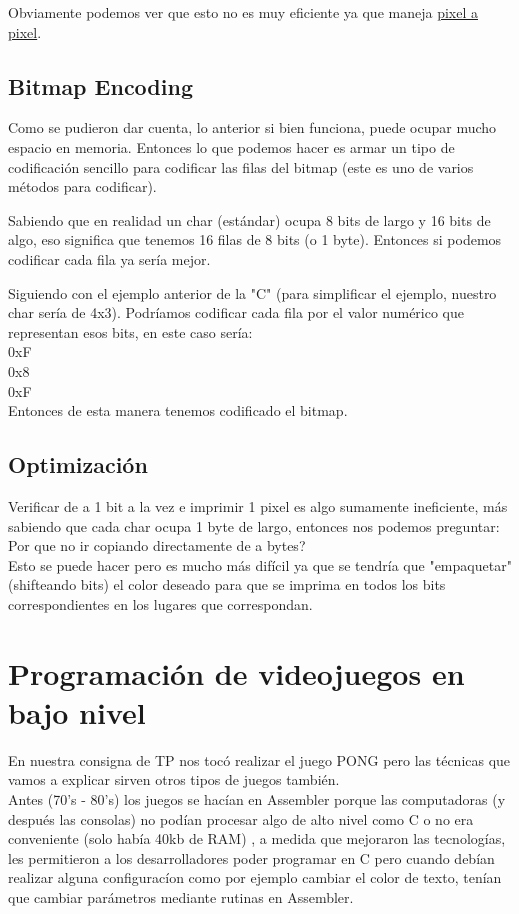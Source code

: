 \documentclass[]{article}
\begin{document}
Obviamente podemos ver que esto no es muy eficiente ya que maneja \underline{pixel a pixel}.\\

\subsection*{Bitmap Encoding}
Como se pudieron dar cuenta, lo anterior si bien funciona, puede ocupar mucho espacio en memoria. Entonces lo que podemos hacer es armar un tipo de codificaci\'on sencillo para codificar las filas del bitmap (este es uno de varios m\'etodos para codificar).

Sabiendo que en realidad un char (est\'andar) ocupa 8 bits de largo y 16 bits de algo, eso significa que tenemos 16 filas de 8 bits (o 1 byte). Entonces si podemos codificar cada fila ya ser\'ia mejor.

Siguiendo con el ejemplo anterior de la "C" (para simplificar el ejemplo, nuestro char ser\'ia de 4x3). Podr\'iamos codificar cada fila por el valor num\'erico que representan esos bits, en este caso ser\'ia:\\
0xF\\
0x8\\
0xF\\
Entonces de esta manera tenemos codificado el bitmap.

\subsection*{Optimizaci\'on}
Verificar de a 1 bit a la vez e imprimir 1 pixel es algo sumamente ineficiente, m\'as sabiendo que cada char ocupa 1 byte de largo, entonces nos podemos preguntar: Por que no ir copiando directamente de a bytes?\\

Esto se puede hacer pero es mucho m\'as dif\'icil ya que se tendr\'ia que "empaquetar" (shifteando bits) el color deseado para que se imprima en todos los bits correspondientes en los lugares que correspondan.


\section*{Programaci\'on de videojuegos en bajo nivel}
En nuestra consigna de TP nos toc\'o realizar el juego PONG pero las t\'ecnicas que vamos a explicar sirven otros tipos de juegos tambi\'en.\\

Antes (70's - 80's) los juegos se hac\'ian en Assembler porque las computadoras (y despu\'es las consolas) no pod\'ian procesar algo de alto nivel como C o no era conveniente (solo hab\'ia 40kb de RAM) , a medida que mejoraron las tecnolog\'ias, les permitieron a los desarrolladores poder programar en C pero cuando deb\'ian realizar alguna configurac\'ion como por ejemplo cambiar el color de texto, ten\'ian que cambiar par\'ametros mediante rutinas en Assembler.\\
\end{document}
